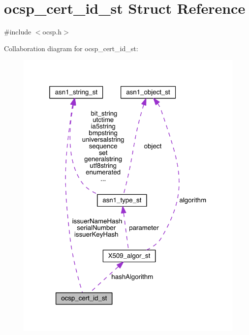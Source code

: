 \hypertarget{structocsp__cert__id__st}{}\section{ocsp\+\_\+cert\+\_\+id\+\_\+st Struct Reference}
\label{structocsp__cert__id__st}


{\ttfamily \#include $<$ocsp.\+h$>$}



Collaboration diagram for ocsp\+\_\+cert\+\_\+id\+\_\+st\+:\nopagebreak
\begin{figure}[H]
\begin{center}
\leavevmode
\includegraphics[width=319pt]{structocsp__cert__id__st__coll__graph}
\end{center}
\end{figure}
